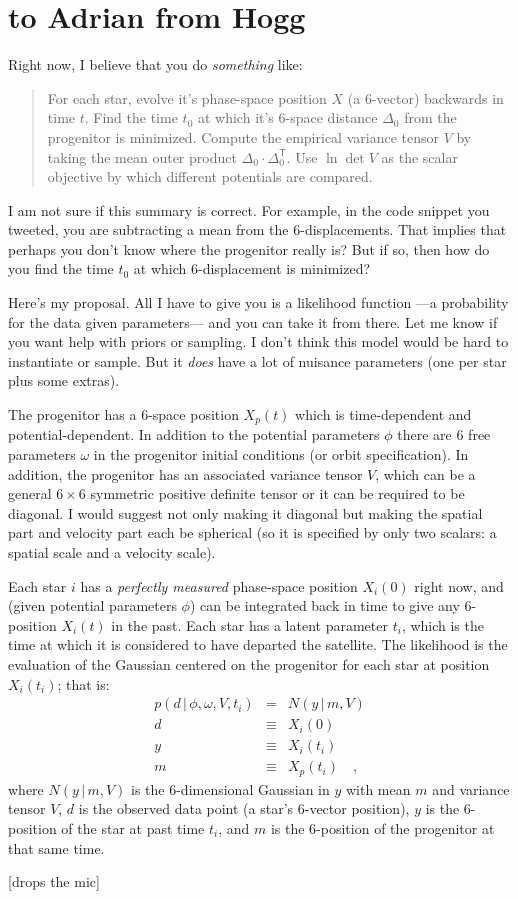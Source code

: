 \documentclass[12pt,letterpaper]{article}
\newcommand{\TT}{{\!\mathsf{T}}}
\newcommand{\given}{\,|\,}
\begin{document}
\section*{to Adrian from Hogg}

Right now, I believe that you do \emph{something} like:
\begin{quote}
For each star,
evolve it's phase-space position $X$ (a 6-vector) backwards in time $t$.
Find the time $t_0$ at which it's 6-space distance $\Delta_0$ from the progenitor is minimized.
Compute the empirical variance tensor $V$ by taking the mean outer product $\Delta_0\cdot \Delta_0^\TT$.
Use $\ln\det V$ as the scalar objective by which different potentials are compared.
\end{quote}
I am not sure if this summary is correct.
For example, in the code snippet you tweeted, you are subtracting a mean from the 6-displacements.
That implies that perhaps you don't know where the progenitor really is?
But if so, then how do you find the time $t_0$ at which 6-displacement is minimized?

Here's my proposal.
All I have to give you is a likelihood function%
---a probability for the data given parameters---%
and you can take it from there.
Let me know if you want help with priors or sampling.
I don't think this model would be hard to instantiate or sample.
But it \emph{does} have a lot of nuisance parameters (one per star plus some extras).

The progenitor has a 6-space position $X_p(t)$ which is time-dependent and potential-dependent.
In addition to the potential parameters $\phi$
there are 6 free parameters $\omega$ in the progenitor initial conditions (or orbit specification).
In addition, the progenitor has an associated variance tensor $V$,
which can be a general $6\times 6$ symmetric positive definite tensor or it can be required to be diagonal.
I would suggest not only making it diagonal but making the spatial part and velocity part each be spherical
(so it is specified by only two scalars: a spatial scale and a velocity scale).

Each star $i$ has a \emph{perfectly measured} phase-space position $X_i(0)$ right now,
and (given potential parameters $\phi$) can be integrated back in time to give any 6-position $X_i(t)$ in the past.
Each star has a latent parameter $t_i$,
which is the time at which it is considered to have departed the satellite.
The likelihood is the evaluation of the Gaussian centered on the progenitor for each star at position $X_i(t_i)$;
that is:
\begin{eqnarray}
p(d\given \phi,\omega,V,t_i) &=& N(y\given m,V)
\\
d &\equiv& X_i(0)
\\
y &\equiv& X_i(t_i)
\\
m &\equiv& X_p(t_i)
\quad ,
\end{eqnarray}
where
$N(y\given m,V)$ is the 6-dimensional Gaussian in $y$ with mean $m$ and variance tensor $V$,
$d$ is the observed data point (a star's 6-vector position),
$y$ is the 6-position of the star at past time $t_i$,
and $m$ is the 6-position of the progenitor at that same time.

[drops the mic]
\end{document}
